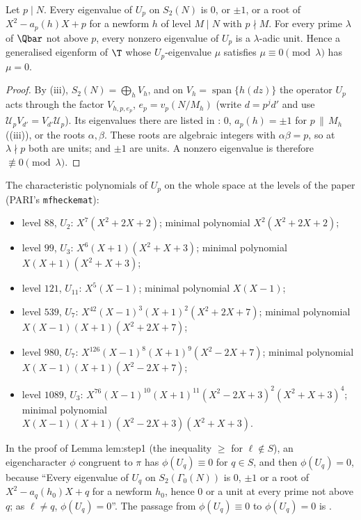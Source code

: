 \begin{corollary}\label{cor:hecke:Up-eigenvalues}
Let $p\mid N$. Every eigenvalue of $U_p$ on $S_2(N)$ is $0$, or $\pm1$, or a root of $X^2-a_p(h)X+p$ for a newform $h$ of level $M\mid N$ with $p\nmid M$. For every prime $\lambda$ of $\Qbar$
not above $p$, every nonzero eigenvalue of $U_p$ is a $\lambda$-adic unit. Hence a generalised eigenform of $\T$ whose $U_p$-eigenvalue $\mu$ satisfies $\mu\equiv0\pmod\lambda$ has $\mu=0$.
\end{corollary}

\begin{proof}
By (iii), $S_2(N)=\bigoplus_hV_h$, and on $V_h=\operatorname{span}\{h(dz)\}$ the operator $U_p$ acts through the factor $V_{h,p,e_p}$, $e_p=v_p(N/M_h)$ (write $d=p^jd'$ and use
$\mathcal U_pV_{d'}=V_{d'}\mathcal U_p$). Its eigenvalues there are listed in : $0$, $a_p(h)=\pm1$ for $p\,\|\,M_h$ ((iii)), or the roots $\alpha,\beta$. These
roots are algebraic integers with $\alpha\beta=p$, so at $\lambda\nmid p$ both are units; and $\pm1$ are units. A nonzero eigenvalue is therefore $\not\equiv0\pmod\lambda$.
\end{proof}

The characteristic polynomials of $U_p$ on the whole space at the levels of the paper (PARI's \texttt{mfheckemat}):
\begin{itemize}
\item level $88$, $U_2$: $X^7(X^2+2X+2)$; minimal polynomial $X^2(X^2+2X+2)$;
\item level $99$, $U_3$: $X^6(X+1)(X^2+X+3)$; minimal polynomial $X(X+1)(X^2+X+3)$;
\item level $121$, $U_{11}$: $X^5(X-1)$; minimal polynomial $X(X-1)$;
\item level $539$, $U_7$: $X^{42}(X-1)^3(X+1)^2(X^2+2X+7)$; minimal polynomial $X(X-1)(X+1)(X^2+2X+7)$;
\item level $980$, $U_7$: $X^{126}(X-1)^8(X+1)^9(X^2-2X+7)$; minimal polynomial $X(X-1)(X+1)(X^2-2X+7)$;
\item level $1089$, $U_3$: $X^{76}(X-1)^{10}(X+1)^{11}(X^2-2X+3)^2(X^2+X+3)^4$; minimal polynomial\\ $X(X-1)(X+1)(X^2-2X+3)(X^2+X+3)$.
\end{itemize}

\begin{paperlink}\label{pl:hecke:units}
In the proof of Lemma lem:step1 (the inequality $\ge$ for $\ell\notin S$), an eigencharacter $\phi$ congruent to $\pi$ has $\phi(U_q)\equiv0$ for $q\in S$, and then
$\phi(U_q)=0$, because ``Every eigenvalue of $U_q$ on $S_2(\Gamma_0(N))$ is $0$, $\pm1$ or a root of $X^2-a_q(h_0)X+q$ for a newform $h_0$, hence $0$ or a unit at every prime not above $q$; as
$\ell\ne q$, $\phi(U_q)=0$''. The passage from $\phi(U_q)\equiv0$ to $\phi(U_q)=0$ is .
\end{paperlink}

